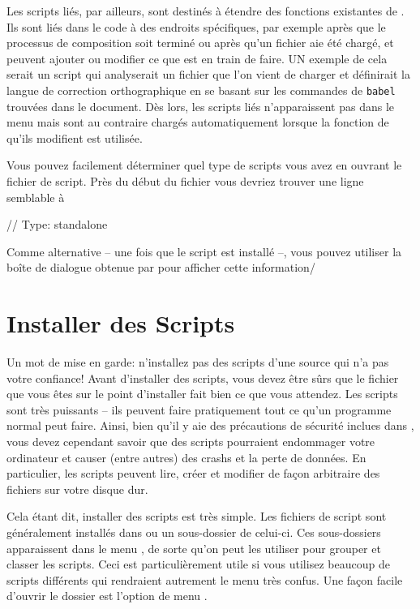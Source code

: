 Les scripts liés, par ailleurs, sont destinés à étendre des fonctions existantes de \Tw. Ils sont liés dans le code à des endroits spécifiques, par exemple après que le processus de composition soit terminé ou après qu'un fichier aie été chargé, et peuvent ajouter ou modifier ce que \Tw{} est en train de faire. UN exemple de cela serait un script qui analyserait un fichier que l'on vient de charger et définirait la langue de correction orthographique en se basant sur les commandes de \verb+babel+ trouvées dans le document. Dès lors, les scripts liés n'apparaissent pas dans le menu  mais sont au contraire chargés automatiquement lorsque la fonction de \Tw{} qu'ils modifient est utilisée.

Vous pouvez facilement déterminer quel type de scripts vous avez en ouvrant le fichier de script. Près du début du fichier vous devriez trouver une ligne semblable à
\begin{verbExample}
// Type: standalone
\end{verbExample}
Comme alternative -- une fois que le script est installé --, vous pouvez utiliser la boîte de dialogue obtenue par \submenu{}\submenu{} pour afficher cette information/

\section{Installer des Scripts}
\label{sec:installing-scripts}

Un mot de mise en garde: n'installez pas des scripts d'une source qui n'a pas votre confiance! Avant d'installer des scripts, vous devez être sûrs que le fichier que vous êtes sur le point d'installer fait bien ce que vous attendez. Les scripts sont très puissants -- ils peuvent faire pratiquement tout ce qu'un programme normal peut faire. Ainsi, bien qu'il y aie des précautions de sécurité inclues dans \Tw, vous devez cependant savoir que des scripts pourraient endommager votre ordinateur et causer (entre autres) des crashs et la perte de données. En particulier, les scripts peuvent lire, créer et modifier de façon arbitraire des fichiers sur votre disque dur.

Cela étant dit, installer des scripts est très simple. Les fichiers de script sont généralement installés dans  ou un sous-dossier de celui-ci. Ces sous-dossiers apparaissent dans le menu , de sorte qu'on peut les utiliser pour grouper et classer les scripts. Ceci est particulièrement utile si vous utilisez beaucoup de scripts différents qui rendraient autrement le menu  très confus. Une façon facile d'ouvrir le dossier  est l'option de menu \submenu{}\submenu{}.

